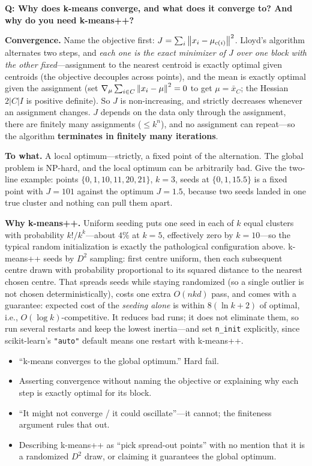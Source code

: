 \begin{interviewq}
\textbf{Q: Why does k-means converge, and what does it converge to? And why do you need k-means++?}

 \quad {} \quad \badgefreq{\freqhigh}

\stronganswer

\textbf{Convergence.} Name the objective first: $J = \sum_i \left\lVert x_i - \mu_{c(i)}\right\rVert^2$. Lloyd's algorithm alternates two steps, and \emph{each one is the exact minimizer of $J$ over one block with the other fixed}---assignment to the nearest centroid is exactly optimal given centroids (the objective decouples across points), and the mean is exactly optimal given the assignment (set $\nabla_\mu \sum_{i \in C}\left\lVert x_i - \mu\right\rVert^2 = 0$ to get $\mu = \bar{x}_C$; the Hessian $2|C|I$ is positive definite). So $J$ is non-increasing, and strictly decreases whenever an assignment changes. $J$ depends on the data only through the assignment, there are finitely many assignments ($\le k^n$), and no assignment can repeat---so the algorithm \textbf{terminates in finitely many iterations}.

\textbf{To what.} A local optimum---strictly, a fixed point of the alternation. The global problem is NP-hard, and the local optimum can be arbitrarily bad. Give the two-line example: points $\{0,1,10,11,20,21\}$, $k=3$, seeds at $\{0,1,15.5\}$ is a fixed point with $J = 101$ against the optimum $J = 1.5$, because two seeds landed in one true cluster and nothing can pull them apart.

\textbf{Why k-means++.} Uniform seeding puts one seed in each of $k$ equal clusters with probability $k!/k^k$---about $4\%$ at $k=5$, effectively zero by $k=10$---so the typical random initialization is exactly the pathological configuration above. k-means++ seeds by $D^2$ sampling: first centre uniform, then each subsequent centre drawn with probability proportional to its squared distance to the nearest chosen centre. That spreads seeds while staying randomized (so a single outlier is not chosen deterministically), costs one extra $O(nkd)$ pass, and comes with a guarantee: expected cost of the \emph{seeding alone} is within $8(\ln k + 2)$ of optimal, i.e., $O(\log k)$-competitive. It reduces bad runs; it does not eliminate them, so run several restarts and keep the lowest inertia---and set \texttt{n\_init} explicitly, since scikit-learn's \texttt{"auto"} default means one restart with k-means++.

\redflags
\begin{itemize}
    \item ``k-means converges to the global optimum.'' Hard fail.
    \item Asserting convergence without naming the objective or explaining why each step is exactly optimal for its block.
    \item ``It might not converge / it could oscillate''---it cannot; the finiteness argument rules that out.
    \item Describing k-means++ as ``pick spread-out points'' with no mention that it is a randomized $D^2$ draw, or claiming it guarantees the global optimum.
\end{itemize}


\end{interviewq}

